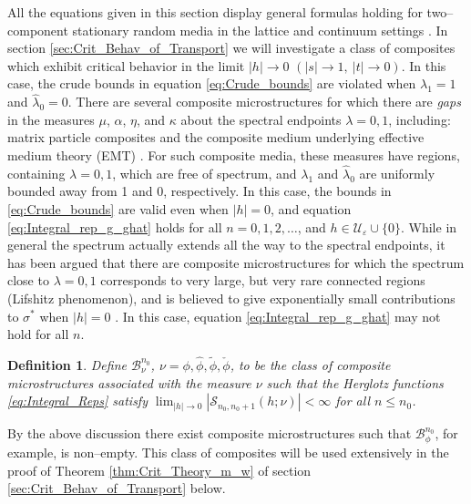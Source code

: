\documentclass[english,12pt,jmp,graphicx]{revtex4-1}
\newtheorem{definition}{Definition}[section]
\newcommand{\ph}{\hat{\phi}}
\newcommand{\pt}{\tilde{\phi}}
\newcommand{\pc}{\check{\phi}}
\begin{document}
All the equations given in this section display general formulas
holding for two--component stationary random media in the lattice and
continuum settings \cite{Golden:PRL-3935}. In section
\ref{sec:Crit_Behav_of_Transport} we will investigate a class of
composites which exhibit critical behavior in the limit $|h|\to0$
$(|s|\to1, \ |t|\to0)$. In this case, the crude bounds in equation
\eqref{eq:Crude_bounds} are violated when $\lambda_1=1$ and
$\hat{\lambda}_0=0$. There are several composite microstructures for which
there are \emph{gaps} in the measures $\mu$, $\alpha$, $\eta$, and $\kappa$ about
the spectral endpoints $\lambda=0,1$, including: matrix particle composites
\cite{Bruno:PRSLA-353} and the composite medium underlying 
effective medium theory (EMT) \cite{MILTON:2002:TC}.
For such composite media, these measures have regions, containing
$\lambda=0,1$, which are free of spectrum, and $\lambda_1$ and $\hat{\lambda}_0$ are
uniformly bounded away from 1 and 0, respectively.
In this case, the bounds in \eqref{eq:Crude_bounds} are valid even
when $|h|=0$, and equation \eqref{eq:Integral_rep_g_ghat}
holds for all $n=0,1,2,\ldots$, and $h\in\mathcal{U}_\varepsilon\cup\{0\}$. 
While in general the spectrum actually extends all the way to the
spectral endpoints, it has been argued that there are composite
microstructures for which the spectrum close to $\lambda=0,1$ corresponds to
very large, but very rare connected regions (Lifshitz phenomenon), and
is believed to give exponentially small contributions to $\sigma^*$ when
$|h|=0$ \cite{Clerc:AP-191,Jonckheere_Luck_JPA_1998}. In this case,
equation \eqref{eq:Integral_rep_g_ghat} may not hold for all $n$. 
%
\begin{definition}\label{def:Bounded_diff_g}
Define $\mathcal{B}_{\nu}^{n_0}$, $\nu=\phi,\ph,\pt,\pc$, to be the class of
composite microstructures associated with the measure $\nu$ such that
the Herglotz functions \eqref{eq:Integral_Reps} satisfy
$\lim_{|h|\to0}|\mathcal{S}_{n_0,n_0+1}(h;\nu)|<\infty$ for all $n\leq n_0$. 
\end{definition}
%
By the above discussion there exist composite microstructures such
that $\mathcal{B}_{\phi}^{n_0}$, for example, is non--empty. This class
of composites will be used extensively in the proof of Theorem
\ref{thm:Crit_Theory_m_w} of section \ref{sec:Crit_Behav_of_Transport} below. 
% 
\end{document}
